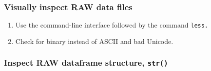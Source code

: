 \documentclass[]{article}
\newenvironment{Shaded}{\begin{snugshade}}{\end{snugshade}}
\newcommand{\CommentTok}[1]{\textcolor[rgb]{0.56,0.35,0.01}{\textit{#1}}}
\newcommand{\KeywordTok}[1]{\textcolor[rgb]{0.13,0.29,0.53}{\textbf{#1}}}
\newcommand{\NormalTok}[1]{#1}
\newcommand{\OperatorTok}[1]{\textcolor[rgb]{0.81,0.36,0.00}{\textbf{#1}}}
\newcommand{\StringTok}[1]{\textcolor[rgb]{0.31,0.60,0.02}{#1}}
\providecommand{\tightlist}{%
  \setlength{\itemsep}{0pt}\setlength{\parskip}{0pt}}
\begin{document}
\begin{Shaded}
\end{Shaded}

\hypertarget{visually-inspect-raw-data-files}{%
\subsubsection{Visually inspect RAW data
files}\label{visually-inspect-raw-data-files}}

\begin{enumerate}
\def\labelenumi{\arabic{enumi}.}
\tightlist
\item
  Use the command-line interface followed by the command \texttt{less.}
\item
  Check for binary instead of ASCII and bad Unicode.
\end{enumerate}

\hypertarget{inspect-raw-dataframe-structure-str}{%
\subsubsection{\texorpdfstring{Inspect RAW dataframe structure,
\texttt{str()}}{Inspect RAW dataframe structure, str()}}\label{inspect-raw-dataframe-structure-str}}
\end{document}
